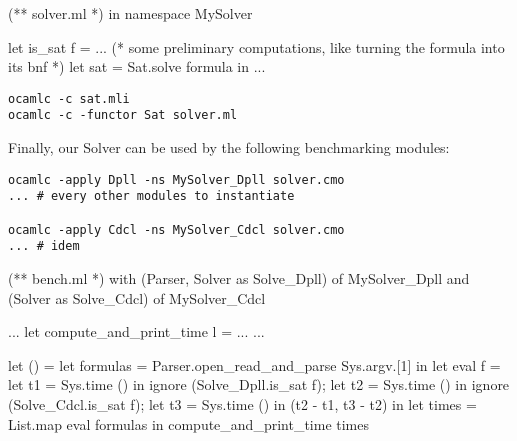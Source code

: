 \documentclass[11pt,a4paper]{article}
\begin{document}
\medskip 

\begin{OCaml}
(** solver.ml *)
in namespace MySolver

let is_sat f =
... 
(* some preliminary computations, like turning the formula into its bnf *)
  let sat = Sat.solve formula in 
...
\end{OCaml}

\begin{verbatim}
ocamlc -c sat.mli
ocamlc -c -functor Sat solver.ml
\end{verbatim}

\medskip

Finally, our Solver can be used by the following benchmarking modules:

\begin{verbatim}
ocamlc -apply Dpll -ns MySolver_Dpll solver.cmo
... # every other modules to instantiate

ocamlc -apply Cdcl -ns MySolver_Cdcl solver.cmo
... # idem 
\end{verbatim}

\begin{OCaml}
(** bench.ml *)
with (Parser, Solver as Solve_Dpll) of MySolver_Dpll
and (Solver as Solve_Cdcl) of MySolver_Cdcl

...
let compute_and_print_time l = ...
...

let () =
  let formulas = 
    Parser.open_read_and_parse Sys.argv.[1] in
  let eval f =
    let t1 = Sys.time () in
    ignore (Solve_Dpll.is_sat f);
    let t2 = Sys.time () in
    ignore (Solve_Cdcl.is_sat f);
    let t3 = Sys.time () in
    (t2 - t1, t3 - t2)
  in
  let times = List.map eval formulas in
  compute_and_print_time times
\end{OCaml}

\medskip



\end{document}
